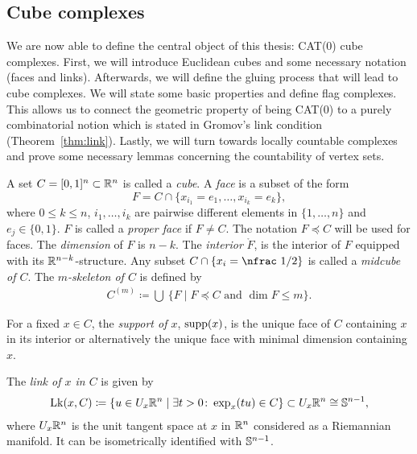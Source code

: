 \subsection{Cube complexes}
\label{sec:complex}

We are now able to define the central object of this thesis: CAT(0) cube complexes. First, we will introduce Euclidean cubes and some necessary notation (faces and links). Afterwards, we will define the gluing process that will lead to cube complexes. We will state some basic properties and define flag complexes. This allows us to connect the geometric property of being CAT(0) to a purely combinatorial notion which is stated in Gromov's link condition (Theorem~\ref{thm:link}). Lastly, we will turn towards locally countable complexes and prove some necessary lemmas concerning the countability of vertex sets.

\begin{defin}[Cubes]
  A set \(C = [0,1]^n \subset \mathbb{R}^n\) is called a \emph{cube}. A \emph{face} is a subset of the form 
  \[
    F = C \cap \{x_{i_1} = e_1, \dots, x_{i_k} = e_k\},
  \]
  where \(0\leq k\leq n\), \(i_1, \dots, i_k\) are pairwise different elements in \(\{1, \dots, n\}\) and \(e_j \in \{0, 1\}\). \(F\) is called a \emph{proper face} if \(F \neq C\). The notation \(F \preceq C\) will be used for faces. The \emph{dimension} of \(F\) is \(n - k\). The \emph{interior} \(\mathring F\), is the interior of \(F\) equipped with its \(\mathbb{R}^{n-k}\)-structure. Any subset \(C \cap \{x_i = \text{\nfrac 1/2}\}\) is called a \emph{midcube of \(C\)}. The \emph{\(m\)-skeleton of \(C\)} is defined by
  \begin{align*}
    C^{(m)} \coloneqq \bigcup\ \{F \mid F \preceq C \text{ and } \dim F \leq m\}.
  \end{align*}

  For a fixed \(x \in C\), the \emph{support of \(x\)}, \(\operatorname{supp}(x)\), is the unique face of \(C\) containing \(x\) in its interior or alternatively the unique face with minimal dimension containing \(x\).

  The \emph{link of \(x\) in \(C\)} is given by
  \begin{align*}
    \operatorname{Lk}(x,C) \coloneqq \{u \in U_x\mathbb{R}^n \mid \exists t > 0 \colon \exp_x(tu) \in C\} \subset U_x\mathbb{R}^n \cong \mathbb{S}^{n-1},
  \end{align*}
  where \(U_x\mathbb{R}^n\) is the unit tangent space at \(x\) in \(\mathbb{R}^n\) considered as a Riemannian manifold. It can be isometrically identified with \(\mathbb{S}^{n-1}\).
\end{defin}

